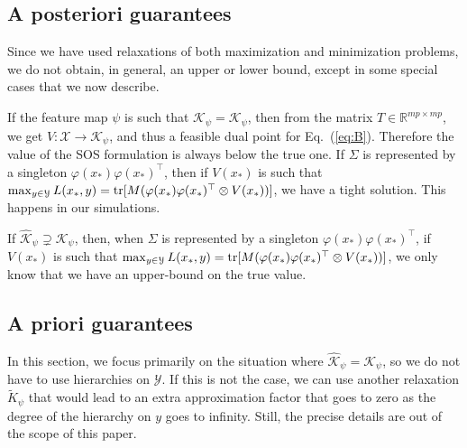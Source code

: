 \documentclass[11pt]{article}
\newcommand{\tr}{\mathop{ \rm tr}}
\newcommand{\rb}{\mathbb{R}}
\newcommand{\eq}[1]{Eq.~(\ref{eq:#1})}
\def \X{{\mathcal X}}
\def \Y{{\mathcal Y}}
\def \K{{\mathcal K}}
\begin{document}
\subsection{A posteriori guarantees}
Since we have used relaxations of both maximization and minimization problems, we do not obtain, in general, an upper or lower bound, except in some special cases that we now describe.

If the feature map $\psi$ is such that $\widehat{\K}_\psi  = \K_\psi$, then from the matrix $T \in \rb^{mp \times mp}$, we get $V: \X \to \K_\psi$, and thus a feasible dual point for 
\eq{B}. Therefore the value of the SOS formulation is always below the true one.
If $\Sigma$ is represented by a singleton $\varphi(x_\ast) \varphi(x_\ast)^\top$, then if $V(x_\ast)$ is such that 
$\max_{y \in \Y} L(x_\ast,y) = \tr[ M ( \varphi(x_\ast)\varphi(x_\ast)^\top \otimes V(x_\ast) )]$, we have a tight solution. This happens in our simulations.

If  $\widehat{\K}_\psi  \supsetneq \K_\psi$, then, when $\Sigma$ is represented by a singleton $\varphi(x_\ast) \varphi(x_\ast)^\top$, if $V(x_\ast)$ is such that 
$\max_{y \in \Y} L(x_\ast,y) = \tr[ M ( \varphi(x_\ast)\varphi(x_\ast)^\top \otimes V(x_\ast) )]$, we only know that we have an upper-bound on the true value.



\subsection{A priori guarantees}

\label{sec:guarantees}

In this section, we focus primarily on the situation where $\widehat{\K}_\psi = \K_\psi$, so we do not have to use hierarchies on $\Y$. If this is not the case, we can use another relaxation $\widetilde{K}_\psi$ that would lead to an extra approximation factor that goes to zero as the degree of the hierarchy on $y$ goes to infinity. Still, the precise details are out of the scope of this paper.
\end{document}
